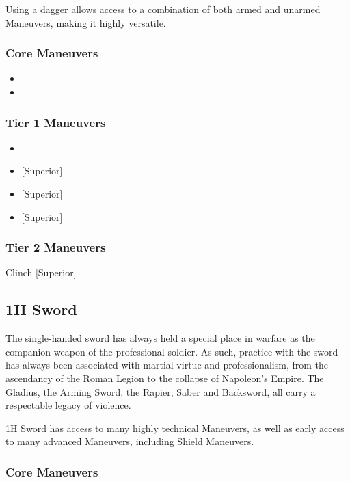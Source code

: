 \documentclass[oneside,11pt,english]{book}
\begin{document}
Using a dagger allows access to a combination of both armed and unarmed Maneuvers, making it highly 
versatile. 

\subsubsection{Core Maneuvers}
\vspace{-5pt}\begin{itemize}
  [itemsep=0.5mm]
\item {}
\item {}
\end{itemize}

\subsubsection{Tier 1 Maneuvers}
\vspace{-5pt}\begin{itemize}
  [itemsep=0.5mm]
\item {}
\item {} [Superior]
\item {} [Superior]
\item {} [Superior]
\end{itemize}
\subsubsection{Tier 2 Maneuvers}
Clinch [Superior]

\subsection{1H Sword}
The single-handed sword has always held a special place in warfare as the companion weapon of the 
professional soldier. As such, practice with the sword has always been associated with martial virtue and 
professionalism, from the ascendancy of the Roman Legion to the collapse of Napoleon’s Empire. The 
Gladius, the Arming Sword, the Rapier, Saber and Backsword, all carry a respectable legacy of violence. 

1H Sword has access to many highly technical Maneuvers, as well as early access to many advanced Maneuvers, including Shield Maneuvers.

\subsubsection{Core Maneuvers}
\end{document}
